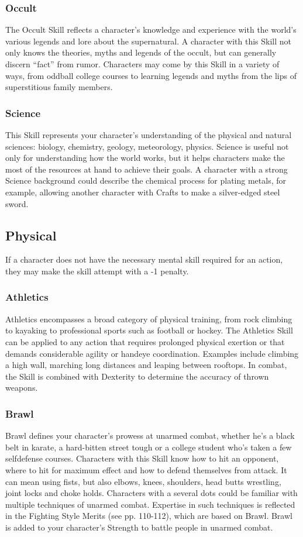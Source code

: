 \documentclass["../Misguided by Starlight.tex"]{subfiles}
\begin{document}
\subsubsection{Occult}
The Occult Skill reflects a character’s knowledge and experience with the world’s various legends and lore about the supernatural. A character with this Skill not only knows the theories, myths and legends of the occult, but can generally discern “fact” from rumor. Characters may come by this Skill in a variety of ways, from oddball college courses to learning legends and myths from the lips of superstitious family members.

\subsubsection{Science}
This Skill represents your character’s understanding of the physical and natural sciences: biology, chemistry, geology, meteorology, physics. Science is useful not only for understanding how the world works, but it helps characters make the most of the resources at hand to achieve their goals. A character with a strong Science background could describe the chemical process for plating metals, for example, allowing another character with Crafts to make a silver-edged steel sword.


\subsection{Physical}
If a character does not have the necessary mental skill required for an action, they may make the skill attempt with a -1 penalty.

\subsubsection{Athletics}
Athletics encompasses a broad category of physical training, from rock climbing to kayaking to professional sports such as football or hockey. The Athletics Skill can be applied to any action that requires prolonged physical exertion or that demands considerable agility or handeye coordination. Examples include climbing a high wall, marching long distances and leaping between rooftops. In combat, the Skill is combined with Dexterity to determine the accuracy of thrown weapons.

\subsubsection{Brawl}
Brawl defines your character’s prowess at unarmed combat, whether he’s a black belt in karate, a hard-bitten street tough or a college student who’s taken a few selfdefense courses. Characters with this Skill know how to hit an opponent, where to hit for maximum effect and how to defend themselves from attack. It can mean using fists, but also elbows, knees, shoulders, head butts wrestling, joint locks and choke holds. Characters with a several dots could be familiar with multiple techniques of unarmed combat. Expertise in such techniques is reflected in the Fighting Style Merits (see pp. 110-112), which are based on Brawl. Brawl is added to your character’s Strength to battle people in unarmed combat.
\end{document}
